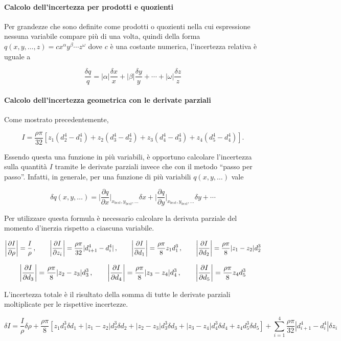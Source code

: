 \documentclass{article}
\newcommand{\quotes}[1]{``#1''}
\begin{document}
\paragraph{Calcolo dell'incertezza per prodotti e quozienti}
Per grandezze che sono definite come prodotti o quozienti nella cui espressione nessuna variabile compare più di una volta, quindi della forma $q(x,y,\ldots, z) = cx^{\alpha}y^{\beta} \cdots z^{\omega}$ dove $c$ è una costante numerica, l'incertezza relativa è uguale a

$$ \frac{\delta q}{q} = |\alpha|\frac{\delta x}{x} + |\beta|\frac{\delta y}{y} + \cdots + |\omega|\frac{\delta z}{z}  $$

\paragraph{Calcolo dell'incertezza geometrica con le derivate parziali}
Come mostrato precedentemente,

$$ I = \frac{\rho \pi}{32}[z_1(d_2^4-d_1^4)+z_2(d_3^4-d_2^4)+z_3(d_4^4-d_3^4)+z_4(d_5^4-d_4^4)].$$

Essendo questa una funzione in più variabili, è opportuno calcolare l'incertezza sulla quantità $I$ tramite le derivate parziali invece che con il metodo \quotes{passo per passo}. Infatti, in generale, per una funzione di più variabili $q(x,y,\ldots)$ vale

$$ \delta q(x,y,\ldots) = \bigg|\frac{\partial q}{\partial x}\bigg|_{x_{best},y_{best},\ldots}\delta x + \bigg|\frac{\partial q}{\partial y}\bigg|_{x_{best},y_{best},\ldots}\delta y + \cdots $$

Per utilizzare questa formula è necessario calcolare la derivata parziale del momento d'inerzia rispetto a ciascuna variabile.

$$ \bigg|\frac{\partial I}{\partial \rho}\bigg| = \frac{I}{\rho} \thinspace , \qquad \bigg|\frac{\partial I}{\partial z_i}\bigg| = \frac{\rho \pi}{32}|d_{i+1}^4-d_i^4| \thinspace , \qquad \bigg|\frac{\partial I}{\partial d_1}\bigg| = \frac{\rho \pi}{8}z_1d_1^3 \thinspace , \qquad \bigg|\frac{\partial I}{\partial d_{2}}\bigg| = \frac{\rho \pi}{8}|z_{1}-z_{2}|d_{2}^3$$

$$ \bigg|\frac{\partial I}{\partial d_{3}}\bigg| = \frac{\rho \pi}{8}|z_{2}-z_{3}|d_{3}^3 \thinspace , \qquad \bigg|\frac{\partial I}{\partial d_{4}}\bigg| = \frac{\rho \pi}{8}|z_{3}-z_{4}|d_{4}^3 \thinspace , \qquad \bigg|\frac{\partial I}{\partial d_5}\bigg| = \frac{\rho \pi}{8}z_4d_5^3 $$

L'incertezza totale è il risultato della somma di tutte le derivate parziali moltiplicate per le rispettive incertezze.

$$ \delta I = \frac{I}{\rho} \delta \rho + \frac{\rho \pi}{8}[z_1d_1^3 \delta d_1 + |z_1-z_2|d_2^3 \delta d_2 + |z_2-z_3|d_3^3 \delta d_3 + |z_3-z_4|d_4^3 \delta d_4 + z_4d_5^3 \delta d_5] + \displaystyle\sum_{i=1}^{4}\frac{\rho \pi}{32}|d_{i+1}^4-d_i^4| \delta z_i $$
\end{document}

